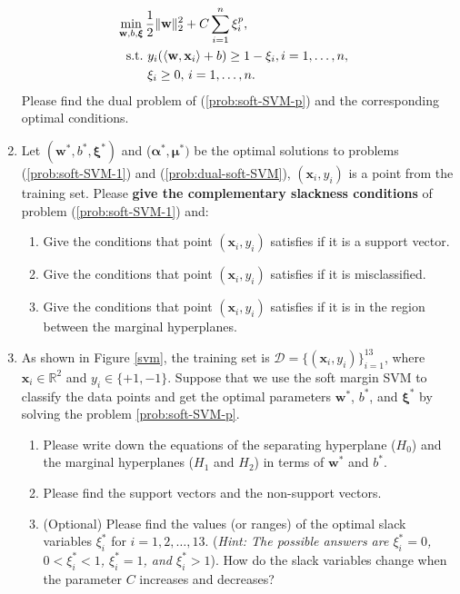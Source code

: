 \documentclass[11pt,letter,notitlepage]{article}
\begin{document}
\begin{exercise}
\begin{enumerate}
\begin{align}
        \min_{\mathbf{w},b,\boldsymbol{\xi}}\,&\frac{1}{2}\|\mathbf{w}\|^2_2+C\sum_{i=1}^n\xi_i^p,\\ \nonumber
        {\rm s.t.\,}&\,y_i(\langle\mathbf{w},\mathbf{x}_i\rangle+b)\geq1-\xi_i,i=1,\ldots,n,&\\ \nonumber
        &\,\xi_i\geq0,\,i=1,\ldots,n.
    \end{align}
    Please find the dual problem of (\ref{prob:soft-SVM-p}) and the corresponding optimal conditions.
    \item Let $(\mathbf{w}^*, b^*, \mathbf{\xi}^*)$ and ($\mathbf{\alpha}^*, \mathbf{\mu}^*)$ be the optimal solutions to problems (\ref{prob:soft-SVM-1}) and (\ref{prob:dual-soft-SVM}), $(\mathbf{x}_i, y_i)$ is a point from the training set. Please \textbf{give the complementary slackness conditions} of problem (\ref{prob:soft-SVM-1}) and:
    \begin{enumerate}
        \item Give the conditions that point $(\mathbf{x}_i, y_i)$ satisfies if it is a support vector.
        \item Give the conditions that point $(\mathbf{x}_i, y_i)$ satisfies if it is misclassified.
        \item Give the conditions that point $(\mathbf{x}_i, y_i)$ satisfies if it is in the region between the marginal hyperplanes.
    \end{enumerate}
    \item As shown in Figure \ref{svm}, the training set is  $\mathcal{D}=\{ (\textbf{x}_i,y_i) \}_{i=1}^{13}$, where $\textbf{x}_i \in \mathbb{R}^2$ and $y_i \in \{ +1,-1 \}$. Suppose that we use the soft margin SVM to classify the data points and get the optimal parameters $\mathbf{w}^*$, $b^*$, and $\boldsymbol{\xi}^*$  by solving the problem \eqref{prob:soft-SVM-p}.
    \begin{enumerate}
        \item Please write down the equations of the separating hyperplane ($H_0$) and the marginal hyperplanes ($H_1$ and $H_2$) in terms of $\mathbf{w}^*$ and $b^*$.
        \item Please find the support vectors and the non-support vectors.
        \item (Optional) Please find the values (or ranges) of the optimal slack variables $\xi_i^*$ for $i=1,2,\dots,13$. (\textit{Hint: The possible answers are $\xi_i^*=0$, $0<\xi_i^*<1$, $\xi_i^*=1$, and $\xi_i^*>1$}). How do the slack variables change when the parameter $C$ increases and decreases?
    \end{enumerate}
\end{enumerate}
\end{exercise}
\end{document}
